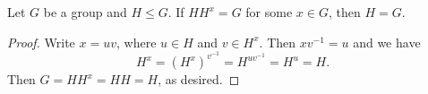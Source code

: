 \begin{lemma}
    Let $G$ be a group and $H\le G$. If $HH^x = G$ for some $x\in G$, then $H = G$.
\end{lemma}
\begin{proof}
    Write $x = uv$, where $u\in H$ and $v\in H^x$. Then $xv^{-1} = u$ and we have 
    \begin{equation*}
        H^x = \left(H^x\right)^{v^{-1}} = H^{uv^{-1}} = H^u = H.
    \end{equation*}
    Then $G = HH^x = HH = H$, as desired.
\end{proof}

    

